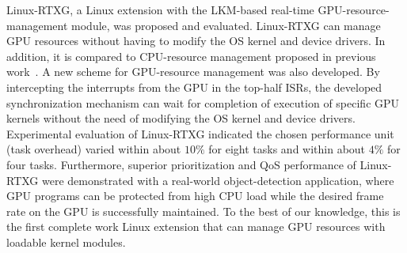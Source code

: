 \label{sec:conclusion}
Linux-RTXG, a Linux extension with the LKM-based real-time GPU-resource-management module, was proposed and evaluated.
Linux-RTXG can manage GPU resources without having to modify the OS kernel and device drivers.
In addition, it is compared to CPU-resource management proposed in previous work~\cite{kato2009loadable, asberg2012exsched}.
A new scheme for GPU-resource management was also developed.
By intercepting the interrupts from the GPU in the top-half ISRs, the developed synchronization mechanism can wait for completion of execution of specific GPU kernels without the need of modifying the OS kernel and device drivers.
Experimental evaluation of Linux-RTXG indicated the chosen performance unit (task overhead) varied within about $10\%$ for eight tasks and within about $4\%$ for four tasks.
Furthermore, superior prioritization and QoS performance of Linux-RTXG were demonstrated with a real-world object-detection application, where GPU programs can be protected from high CPU load while the desired frame rate on the GPU is successfully maintained.
To the best of our knowledge, this is the first complete work Linux extension that can manage GPU resources with loadable kernel modules.
